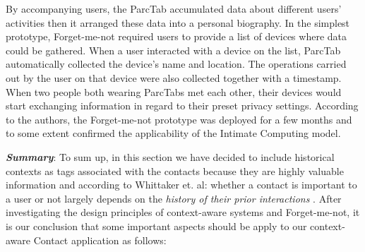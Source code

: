 By accompanying users, the ParcTab accumulated data about different users' activities then it arranged these data into a personal biography. In the simplest prototype, Forget-me-not required users to provide a list of devices where data could be gathered. When a user interacted with a device on the list, ParcTab automatically collected the device's name and location. The operations carried out by the user on that device were also collected together with a timestamp. When two people both wearing ParcTabs met each other, their devices would start exchanging information in regard to their preset privacy settings. According to the authors, the Forget-me-not prototype was deployed for a few months and to some extent confirmed the applicability of the Intimate Computing model. 


\textit{\textbf{Summary}}: To sum up, in this section we have decided to include historical contexts as tags associated with the contacts because they are highly valuable information and according to Whittaker et. al: whether a contact is important to a user or not largely depends on the \textit{history of their prior interactions} \cite{Whittaker2002}. After investigating the design principles of context-aware systems and Forget-me-not, it is our conclusion that some important aspects should be apply to our context-aware Contact application as follows:

